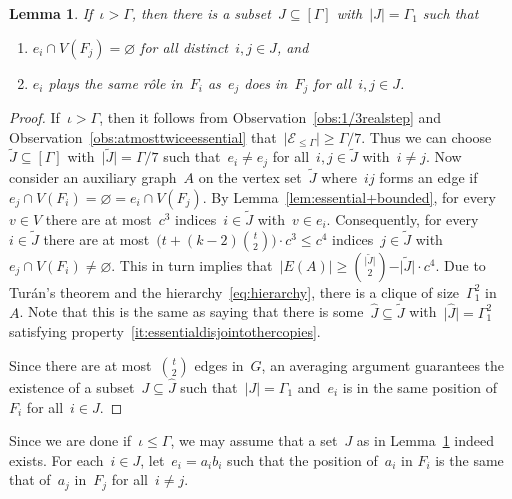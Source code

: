 \documentclass[oneside, 12pt]{amsart}
\numberwithin{equation}{section}
\numberwithin{figure}{section}
\let\emptyset=\varnothing
\newcommand{\cE}{\mathcal{E}}
\theoremstyle{plain}
\newtheorem{lemma}[theorem]{Lemma}
\theoremstyle{note}
\theoremstyle{remark}
\begin{document}
	\begin{lemma}\label{lem:matchingessential}
		If~$\iota>\Gamma$, then there is a subset~$J\subseteq[\Gamma]$ with~$\vert J\vert=\Gamma_1$ such that
		\begin{enumerate}[label=$(\arabic*)$]
			\item \label{it:essentialdisjointothercopies} $e_i \cap V(F_j) = \emptyset$ for all distinct~$i,j\in J$, and
			\item \label{it:playthesamerole} $e_i$ plays the same r\^ole in~$F_i$ as~$e_j$ does in~$F_j$ for all~$i,j\in J$.
		\end{enumerate}
	\end{lemma}
	
	\begin{proof}
        If~$\iota>\Gamma$, then it follows from Observation~\ref{obs:1/3realstep} and Observation~\ref{obs:atmosttwiceessential} that~$\vert\cE_{\leq\Gamma}\vert\geq\Gamma/7$.
        Thus we can choose~$\widetilde{J}\subseteq[\Gamma]$ with~$\vert\widetilde{J}\vert=\Gamma/7$ such that~$e_i\neq e_j$ for all~$i,j\in\widetilde{J}$ with~$i\neq j$.
		Now consider an auxiliary graph~$A$ on the vertex set~$\widetilde{J}$ where~$ij$ forms an edge if~$e_j\cap V(F_i)=\emptyset=e_i\cap V(F_j)$.
        By Lemma~\ref{lem:essential+bounded}, for every~$v\in V$ there are at most~$c^3$ indices~$i\in \widetilde{J}$ with~$v\in e_i$.
        Consequently, for every~$i\in\widetilde{J}$ there are at most~$\big(t+(k-2)\binom{t}{2}\big)\cdot c^3\leq c^4$ indices~$j\in\widetilde{J}$ with~$e_j\cap V(F_i)\neq \emptyset$.
        This in turn implies that~$\vert E(A)\vert\geq\binom{\vert\widetilde{J}\vert}{2}-\vert\widetilde{J}\vert\cdot c^4$.
        Due to Tur\'an's theorem and the hierarchy~\eqref{eq:hierarchy}, there is a clique of size~$\Gamma_1^2$ in~$A$.
        Note that this is the same as saying that there is some~$\hat{J}\subseteq\widetilde{J}$ with~$\vert\hat{J}\vert=\Gamma_1^2$ satisfying property~\ref{it:essentialdisjointothercopies}.
        
		Since there are at most~$\binom{t}{2}$ edges in~$G$, an averaging argument guarantees the existence of a subset~$J\subseteq\hat{J}$ such that~$\vert J\vert=\Gamma_1$ and~$e_i$ is in the same position of~$F_i$ for all~$i\in J$.
	\end{proof}

    Since we are done if~$\iota\leq\Gamma$, we may assume that a set~$J$ as in Lemma~\ref{lem:matchingessential} indeed exists.
	For each~$i\in J$, let~$e_i=a_ib_i$ such that the position of~$a_i$ in $F_i$ is the same that of~$a_j$ in~$F_j$ for all~$i\neq j$.
	
\end{document}
